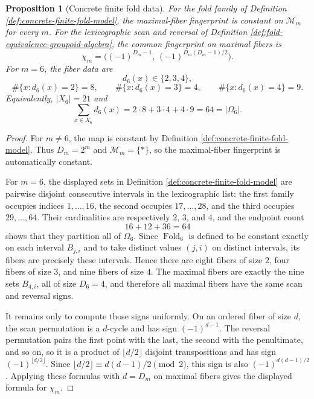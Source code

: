 \documentclass[12pt,a4paper]{article}
\theoremstyle{plain}
\newtheorem{proposition}[theorem]{Proposition}
\theoremstyle{definition}
\numberwithin{equation}{section}
\newcommand{\Fold}{\operatorname{Fold}}
\begin{document}
\begin{proposition}[Concrete finite fold data]\label{prop:concrete-finite-fold-data}
For the fold family of Definition \ref{def:concrete-finite-fold-model}, the maximal-fiber fingerprint is constant on \(\mathcal M_m\) for every \(m\). For the lexicographic scan and reversal of Definition \ref{def:fold-equivalence-groupoid-algebra}, the common fingerprint on maximal fibers is
\[
\chi_m=\bigl((-1)^{D_m-1},\,(-1)^{D_m(D_m-1)/2}\bigr).
\]
For \(m=6\), the fiber data are
\[
d_6(x)\in\{2,3,4\},
\]
\[
\#\{x:d_6(x)=2\}=8,\qquad
\#\{x:d_6(x)=3\}=4,\qquad
\#\{x:d_6(x)=4\}=9.
\]
Equivalently, \(|X_6|=21\) and
\[
\sum_{x\in X_6}d_6(x)=2\cdot8+3\cdot4+4\cdot9=64=|\Omega_6|.
\]
\end{proposition}

\begin{proof}
For \(m\ne6\), the map is constant by Definition \ref{def:concrete-finite-fold-model}. Thus \(D_m=2^m\) and \(\mathcal M_m=\{\ast\}\), so the maximal-fiber fingerprint is automatically constant.

For \(m=6\), the displayed sets in Definition \ref{def:concrete-finite-fold-model} are pairwise disjoint consecutive intervals in the lexicographic list: the first family occupies indices \(1,\ldots,16\), the second occupies \(17,\ldots,28\), and the third occupies \(29,\ldots,64\). Their cardinalities are respectively \(2\), \(3\), and \(4\), and the endpoint count
\[
16+12+36=64
\]
shows that they partition all of \(\Omega_6\). Since \(\Fold_6\) is defined to be constant exactly on each interval \(B_{j,i}\) and to take distinct values \((j,i)\) on distinct intervals, its fibers are precisely these intervals. Hence there are eight fibers of size \(2\), four fibers of size \(3\), and nine fibers of size \(4\). The maximal fibers are exactly the nine sets \(B_{4,i}\), all of size \(D_6=4\), and therefore all maximal fibers have the same scan and reversal signs.

It remains only to compute those signs uniformly. On an ordered fiber of size \(d\), the scan permutation is a \(d\)-cycle and has sign \((-1)^{d-1}\). The reversal permutation pairs the first point with the last, the second with the penultimate, and so on, so it is a product of \(\lfloor d/2\rfloor\) disjoint transpositions and has sign \((-1)^{\lfloor d/2\rfloor}\). Since \(\lfloor d/2\rfloor\equiv d(d-1)/2\pmod 2\), this sign is also \((-1)^{d(d-1)/2}\). Applying these formulas with \(d=D_m\) on maximal fibers gives the displayed formula for \(\chi_m\).
\end{proof}
\end{document}
